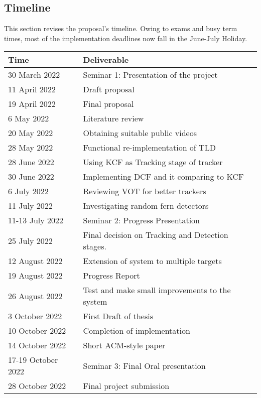 \subsection{Timeline}
This section revises the proposal's timeline.
Owing to exams and busy term times, most of the implementation deadlines now fall in the June-July Holiday.
\begin{center}
  \begin{tabular}{l l}
    \toprule
      Time & Deliverable\\
    \midrule
      30 March 2022     & Seminar 1: Presentation of the project\\
      11 April 2022     & Draft proposal\\
      19 April 2022     & Final proposal\\
      6 May 2022        & Literature review\\
      20 May 2022       & Obtaining suitable public videos\\
      28 May 2022       & Functional re-implementation of TLD\\
      28 June 2022      & Using KCF as Tracking stage of tracker\\
      30 June 2022      & Implementing DCF and it comparing to KCF\\
      6 July 2022       & Reviewing VOT for better trackers\\
      11 July 2022      & Investigating random fern detectors\\
      11-13 July 2022   & Seminar 2: Progress Presentation\\
      25 July 2022      & Final decision on Tracking and Detection stages.\\
      12 August 2022    & Extension of system to multiple targets\\
      19 August 2022    & Progress Report\\
      26 August 2022    & Test and make small improvements to the system\\
      3 October 2022    & First Draft of thesis\\
      10 October 2022   & Completion of implementation\\
      14 October 2022   & Short ACM-style paper\\
      17-19 October 2022& Seminar 3: Final Oral presentation\\
      28 October 2022   & Final project submission\\
    \bottomrule
  \end{tabular}
\end{center}
